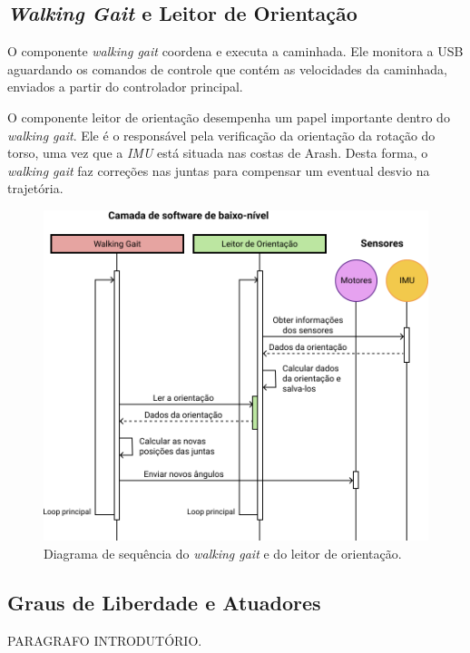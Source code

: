 \subsection{\textit{Walking Gait} e Leitor de Orientação}

O componente \textit{walking gait} coordena e executa a caminhada. Ele monitora a USB aguardando os comandos de controle que contém as velocidades da caminhada, enviados a partir do controlador principal.

O componente leitor de orientação desempenha um papel importante dentro do \textit{walking gait}. Ele é o responsável pela verificação da orientação da rotação do torso, uma vez que a \textit{IMU} está situada nas costas de Arash. Desta forma, o \textit{walking gait} faz correções nas juntas para compensar um eventual desvio na trajetória.

\begin{figure}[b!]
	\centering
	\includegraphics[scale=1]{imagens/svg/softwarearchitecture-lowlevel}
	\caption{Diagrama de sequência do \textit{walking gait} e do leitor de orientação.}
	\label{fig:softwarearchitecture:lowlevel}
\end{figure}

\subsection{Graus de Liberdade e Atuadores}
\label{subsec:architecture:Atuators}

PARAGRAFO INTRODUTÓRIO.

